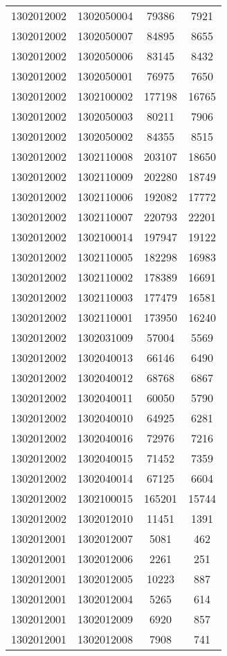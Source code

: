 \begin{longtable}[h]{llcc}
		1302012002 & 1302050004 & 79386 & 7921\\
		1302012002 & 1302050007 & 84895 & 8655\\
		1302012002 & 1302050006 & 83145 & 8432\\
		1302012002 & 1302050001 & 76975 & 7650\\
		1302012002 & 1302100002 & 177198 & 16765\\
		1302012002 & 1302050003 & 80211 & 7906\\
		1302012002 & 1302050002 & 84355 & 8515\\
		1302012002 & 1302110008 & 203107 & 18650\\
		1302012002 & 1302110009 & 202280 & 18749\\
		1302012002 & 1302110006 & 192082 & 17772\\
		1302012002 & 1302110007 & 220793 & 22201\\
		1302012002 & 1302100014 & 197947 & 19122\\
		1302012002 & 1302110005 & 182298 & 16983\\
		1302012002 & 1302110002 & 178389 & 16691\\
		1302012002 & 1302110003 & 177479 & 16581\\
		1302012002 & 1302110001 & 173950 & 16240\\
		1302012002 & 1302031009 & 57004 & 5569\\
		1302012002 & 1302040013 & 66146 & 6490\\
		1302012002 & 1302040012 & 68768 & 6867\\
		1302012002 & 1302040011 & 60050 & 5790\\
		1302012002 & 1302040010 & 64925 & 6281\\
		1302012002 & 1302040016 & 72976 & 7216\\
		1302012002 & 1302040015 & 71452 & 7359\\
		1302012002 & 1302040014 & 67125 & 6604\\
		1302012002 & 1302100015 & 165201 & 15744\\
		1302012002 & 1302012010 & 11451 & 1391\\
		1302012001 & 1302012007 & 5081 & 462\\
		1302012001 & 1302012006 & 2261 & 251\\
		1302012001 & 1302012005 & 10223 & 887\\
		1302012001 & 1302012004 & 5265 & 614\\
		1302012001 & 1302012009 & 6920 & 857\\
		1302012001 & 1302012008 & 7908 & 741\\

\end{longtable}
